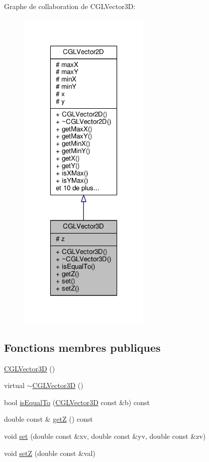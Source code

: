 Graphe de collaboration de C\-G\-L\-Vector3\-D\-:
\nopagebreak
\begin{figure}[H]
\begin{center}
\leavevmode
\includegraphics[width=178pt]{d6/d30/class_c_g_l_vector3_d__coll__graph}
\end{center}
\end{figure}
\subsection*{Fonctions membres publiques}
\begin{DoxyCompactItemize}
\item 
\hyperlink{class_c_g_l_vector3_d_a23c221e455e1b5e4733c0e9baf68c1f3}{C\-G\-L\-Vector3\-D} ()
\item 
virtual \hyperlink{class_c_g_l_vector3_d_ae7a23a5f882bbdd9489f51ddc86b0f02}{$\sim$\-C\-G\-L\-Vector3\-D} ()
\item 
bool \hyperlink{class_c_g_l_vector3_d_a339da32afa5a535aec027aba6b92e9b5}{is\-Equal\-To} (\hyperlink{class_c_g_l_vector3_d}{C\-G\-L\-Vector3\-D} const \&b) const 
\item 
double const \& \hyperlink{class_c_g_l_vector3_d_a374bca193aae71220f1349a6ab0778ee}{get\-Z} () const 
\item 
void \hyperlink{class_c_g_l_vector3_d_a15014f4427c214f64699590591cacc8f}{set} (double const \&xv, double const \&yv, double const \&zv)
\item 
void \hyperlink{class_c_g_l_vector3_d_afef476ba51f4f45cb9d64e5d6c1592a4}{set\-Z} (double const \&val)
\end{DoxyCompactItemize}
